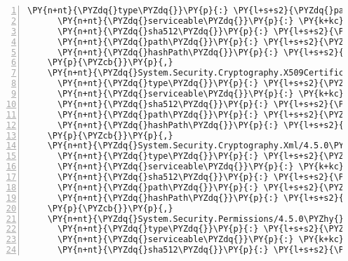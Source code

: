 \begin{Verbatim}[commandchars=\\\{\},numbers=left,firstnumber=1,stepnumber=1,numberblanklines=0]
      \PY{n+nt}{\PYZdq{}type\PYZdq{}}\PY{p}{:} \PY{l+s+s2}{\PYZdq{}package\PYZdq{}}\PY{p}{,}
      \PY{n+nt}{\PYZdq{}serviceable\PYZdq{}}\PY{p}{:} \PY{k+kc}{true}\PY{p}{,}
      \PY{n+nt}{\PYZdq{}sha512\PYZdq{}}\PY{p}{:} \PY{l+s+s2}{\PYZdq{}sha512\PYZhy{}7bDIyVFNL/xKeFHjhobUAQqSpJq9YTOpbEs6mR233Et01STBMXNAc/V+BM6dwYGc95gVh/Zf+iVXWzj3mE8DWg==\PYZdq{}}\PY{p}{,}
      \PY{n+nt}{\PYZdq{}path\PYZdq{}}\PY{p}{:} \PY{l+s+s2}{\PYZdq{}system.security.cryptography.primitives/4.3.0\PYZdq{}}\PY{p}{,}
      \PY{n+nt}{\PYZdq{}hashPath\PYZdq{}}\PY{p}{:} \PY{l+s+s2}{\PYZdq{}system.security.cryptography.primitives.4.3.0.nupkg.sha512\PYZdq{}}
    \PY{p}{\PYZcb{}}\PY{p}{,}
    \PY{n+nt}{\PYZdq{}System.Security.Cryptography.X509Certificates/4.3.0\PYZdq{}}\PY{p}{:} \PY{p}{\PYZob{}}
      \PY{n+nt}{\PYZdq{}type\PYZdq{}}\PY{p}{:} \PY{l+s+s2}{\PYZdq{}package\PYZdq{}}\PY{p}{,}
      \PY{n+nt}{\PYZdq{}serviceable\PYZdq{}}\PY{p}{:} \PY{k+kc}{true}\PY{p}{,}
      \PY{n+nt}{\PYZdq{}sha512\PYZdq{}}\PY{p}{:} \PY{l+s+s2}{\PYZdq{}sha512\PYZhy{}t2Tmu6Y2NtJ2um0RtcuhP7ZdNNxXEgUm2JeoA/0NvlMjAhKCnM1NX07TDl3244mVp3QU6LPEhT3HTtH1uF7IYw==\PYZdq{}}\PY{p}{,}
      \PY{n+nt}{\PYZdq{}path\PYZdq{}}\PY{p}{:} \PY{l+s+s2}{\PYZdq{}system.security.cryptography.x509certificates/4.3.0\PYZdq{}}\PY{p}{,}
      \PY{n+nt}{\PYZdq{}hashPath\PYZdq{}}\PY{p}{:} \PY{l+s+s2}{\PYZdq{}system.security.cryptography.x509certificates.4.3.0.nupkg.sha512\PYZdq{}}
    \PY{p}{\PYZcb{}}\PY{p}{,}
    \PY{n+nt}{\PYZdq{}System.Security.Cryptography.Xml/4.5.0\PYZhy{}rc1\PYZdq{}}\PY{p}{:} \PY{p}{\PYZob{}}
      \PY{n+nt}{\PYZdq{}type\PYZdq{}}\PY{p}{:} \PY{l+s+s2}{\PYZdq{}package\PYZdq{}}\PY{p}{,}
      \PY{n+nt}{\PYZdq{}serviceable\PYZdq{}}\PY{p}{:} \PY{k+kc}{true}\PY{p}{,}
      \PY{n+nt}{\PYZdq{}sha512\PYZdq{}}\PY{p}{:} \PY{l+s+s2}{\PYZdq{}sha512\PYZhy{}l6kXtbOsqskKHRIhloRi1sclQcVGy/pZt3ucg/21OmWH2OQVeyE0iDoSpjHNIrnE/aQAVd7wRWOUTbcEbGzT7A==\PYZdq{}}\PY{p}{,}
      \PY{n+nt}{\PYZdq{}path\PYZdq{}}\PY{p}{:} \PY{l+s+s2}{\PYZdq{}system.security.cryptography.xml/4.5.0\PYZhy{}rc1\PYZdq{}}\PY{p}{,}
      \PY{n+nt}{\PYZdq{}hashPath\PYZdq{}}\PY{p}{:} \PY{l+s+s2}{\PYZdq{}system.security.cryptography.xml.4.5.0\PYZhy{}rc1.nupkg.sha512\PYZdq{}}
    \PY{p}{\PYZcb{}}\PY{p}{,}
    \PY{n+nt}{\PYZdq{}System.Security.Permissions/4.5.0\PYZhy{}rc1\PYZdq{}}\PY{p}{:} \PY{p}{\PYZob{}}
      \PY{n+nt}{\PYZdq{}type\PYZdq{}}\PY{p}{:} \PY{l+s+s2}{\PYZdq{}package\PYZdq{}}\PY{p}{,}
      \PY{n+nt}{\PYZdq{}serviceable\PYZdq{}}\PY{p}{:} \PY{k+kc}{true}\PY{p}{,}
      \PY{n+nt}{\PYZdq{}sha512\PYZdq{}}\PY{p}{:} \PY{l+s+s2}{\PYZdq{}sha512\PYZhy{}jUT+xmY7pEUA8XermhhPAY1BHq95i1e4jCwwPiVdTe98FasuMhPEbOaYas+O2iiU6pmHcU5+Be9i70lvbfZHqg==\PYZdq{}}\PY{p}{,}

\end{Verbatim}
